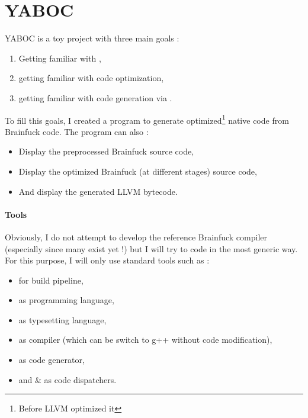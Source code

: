 \section{YABOC}%
\gls{YABOC} is a toy project with three main goals :
\begin{enumerate}
        \item Getting familiar with ,
        \item getting familiar with code optimization,
        \item getting familiar with code generation via .
\end{enumerate}

To fill this goals, I created a program to generate optimized\footnote{Before LLVM optimized it} native code from Brainfuck code. The program can also :
\begin{itemize}
        \item Display the preprocessed Brainfuck source code,
        \item Display the optimized Brainfuck (at different stages) source code,
        \item And display the generated LLVM bytecode.
\end{itemize}

\paragraph{Tools} 
Obviously, I do not attempt to develop the reference Brainfuck compiler (especially since many exist yet !) but I will try to code in the most generic way. For this purpose, I will only use standard tools such as :
\begin{itemize}
        \item {} for build pipeline,
        \item {} as programming language,
        \item \tbf{\LaTeX} as typesetting language,
        \item {} as compiler (which can be switch to g++ without code modification),
        \item {} as code generator,
        \item and  \&  as code dispatchers.
\end{itemize}

